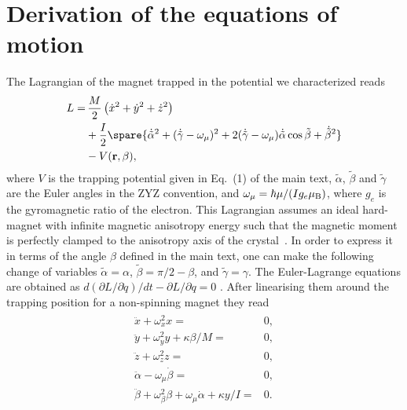 \documentclass[twocolumn,superscriptaddress,floatfix,preprintnumbers,prl]{revtex4}
\begin{document}
\section{Derivation of the equations of motion}

The Lagrangian of the magnet trapped in the potential we characterized reads~\cite{Rusconi2017} 
\begin{align}
\begin{split}
L=&\,\frac{M}{2}\left(\dot{x}^2+\dot{y}^2+\dot{z}^2\right)\\
&+\frac{I}{2}\spare{\dot{\tilde{\alpha}}^2+(\dot{\tilde{\gamma}}-\omega_{\mu})^2+2(\dot{\tilde{\gamma}}-\omega_{\mu})\dot{\tilde{\alpha}}\cos\tilde{\beta}+\dot{\tilde{\beta}}^2 }\\
&-V(\mathbf{r},\beta),
\end{split}
\end{align}
where $V$ is the trapping potential given in Eq.~(1) of the main text, $\tilde{\alpha}$, $\tilde{\beta}$ and $\tilde{\gamma}$ are the Euler angles in the ZYZ convention, and $\omega_{\mu}=\hbar \mu/(I g_e \mu_{\rm B})$, where $g_e$ is the gyromagnetic ratio of the electron. This Lagrangian assumes an ideal hard-magnet with infinite magnetic anisotropy energy such that the magnetic moment is perfectly clamped to the anisotropy axis of the crystal~\cite{Rusconi2017}. In order to express it in terms of the angle $\beta$ defined in the main text, one can make the following change of variables $\tilde{\alpha}=\alpha$, $\tilde{\beta}=\pi/2-\beta$, and $\tilde{\gamma}=\gamma$. The Euler-Lagrange equations are obtained as $d(\partial L/\partial \dot{q})/dt-\partial L/ \partial q=0$ . After linearising them around the trapping position for a non-spinning magnet they read
\begin{align}
\begin{split}
    \ddot{x}+ \omega_x^2 x= & 0,\\
    \ddot{y}+\omega_y^2 y+\kappa \beta/M = & 0,\\
    \ddot{z}+\omega_z^2 z= & 0,\\
    \ddot{\alpha}-\omega_{\mu} \dot{\beta}= & 0,\\
    \ddot{\beta}+\omega_{\beta}^2 \beta +\omega_{\mu} \dot{\alpha}+\kappa y/I= & 0.
\end{split}
\end{align}
\end{document}
